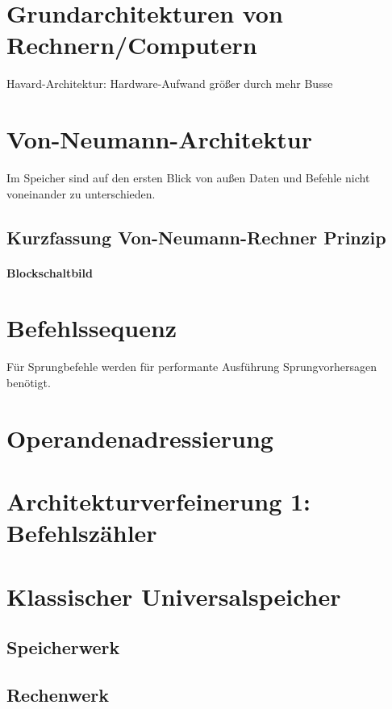 \section{Grundarchitekturen von Rechnern/Computern}
Havard-Architektur: Hardware-Aufwand größer durch mehr Busse

\section{Von-Neumann-Architektur}
Im Speicher sind auf den ersten Blick von außen Daten und Befehle nicht voneinander zu unterschieden.

\subsection{Kurzfassung Von-Neumann-Rechner Prinzip}
\paragraph{Blockschaltbild}

\section{Befehlssequenz}
Für Sprungbefehle werden für performante Ausführung Sprungvorhersagen benötigt.

\section{Operandenadressierung}

\section{Architekturverfeinerung 1: Befehlszähler}

\section{Klassischer Universalspeicher}
\subsection{Speicherwerk}
\subsection{Rechenwerk}
